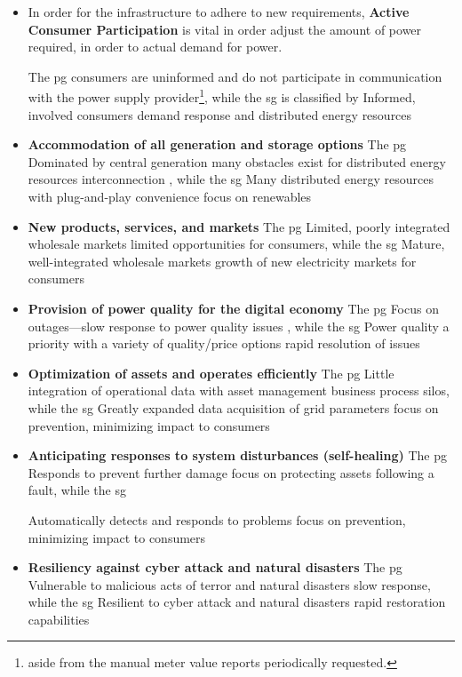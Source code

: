 \begin{itemize}
    \item In order for the infrastructure to adhere to new requirements, \textbf{Active Consumer Participation} is vital in order adjust the amount of power required, in order to actual demand for power.

The \acrshort{pg} consumers are uninformed and do not participate in communication with the power supply provider\footnote{aside from the manual meter value reports periodically requested.}, while the \acrshort{sg} is classified by Informed, involved consumers demand response and distributed energy resources

\item \textbf{Accommodation of all generation and storage options}
The \acrshort{pg}  Dominated by central generation many obstacles exist for distributed energy resources interconnection , while the \acrshort{sg} Many distributed energy resources with plug-and-play convenience focus on renewables

\item \textbf{New products, services, and markets} 
The \acrshort{pg}  Limited, poorly integrated wholesale markets limited opportunities for consumers, while the \acrshort{sg} Mature, well-integrated wholesale markets growth of new electricity markets for consumers


\item \textbf{Provision of power quality for the digital economy} 
The \acrshort{pg} Focus on outages—slow response to power quality issues
, while the \acrshort{sg} Power quality a priority with a variety of quality/price options rapid resolution of issues 


\item \textbf{Optimization of assets and operates efficiently}
The \acrshort{pg} Little integration of operational data with asset management business process silos, while the \acrshort{sg} Greatly expanded data acquisition of grid parameters focus on prevention, minimizing impact to consumers 


\item \textbf{Anticipating responses to system disturbances (self-healing)}
The \acrshort{pg} Responds to prevent further damage focus on protecting assets following a fault, while the \acrshort{sg}

Automatically detects and responds to problems focus on prevention, minimizing impact to consumers 


\item \textbf{Resiliency against cyber attack and natural disasters} The \acrshort{pg}  Vulnerable to malicious acts of terror and natural disasters slow response, while the \acrshort{sg} Resilient to cyber attack and natural disasters rapid restoration capabilities 



\end{itemize}



